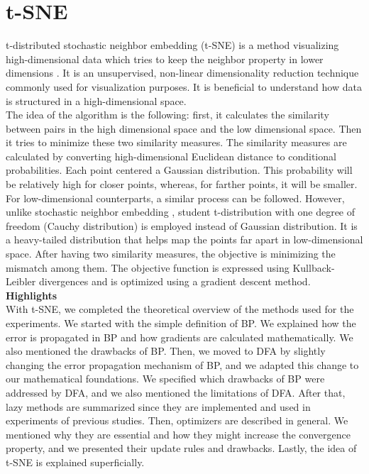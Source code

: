 \documentclass[a4paper, nobind]{templates/ociamthesis}
\begin{document}
\hypertarget{t-sne}{%
\section{t-SNE}\label{t-sne}}

t-distributed stochastic neighbor embedding (t-SNE) is a method visualizing high-dimensional data which tries to keep the neighbor property in lower dimensions \cite{vanDerMaaten2008}. It is an unsupervised, non-linear dimensionality reduction technique commonly used for visualization purposes. It is beneficial to understand how data is structured in a high-dimensional space.\\
The idea of the algorithm is the following: first, it calculates the similarity between pairs in the high dimensional space and the low dimensional space. Then it tries to minimize these two similarity measures. The similarity measures are calculated by converting high-dimensional Euclidean distance to conditional probabilities. Each point centered a Gaussian distribution. This probability will be relatively high for closer points, whereas, for farther points, it will be smaller. For low-dimensional counterparts, a similar process can be followed. However, unlike stochastic neighbor embedding \cite{Hinton_Roweis_2003}, student t-distribution with one degree of freedom (Cauchy distribution) is employed instead of Gaussian distribution. It is a heavy-tailed distribution that helps map the points far apart in low-dimensional space. After having two similarity measures, the objective is minimizing the mismatch among them. The objective function is expressed using Kullback-Leibler divergences and is optimized using a gradient descent method.\\

\noindent \textbf{Highlights}\\
\noindent With t-SNE, we completed the theoretical overview of the methods used for the experiments. We started with the simple definition of BP. We explained how the error is propagated in BP and how gradients are calculated mathematically. We also mentioned the drawbacks of BP. Then, we moved to DFA by slightly changing the error propagation mechanism of BP, and we adapted this change to our mathematical foundations. We specified which drawbacks of BP were addressed by DFA, and we also mentioned the limitations of DFA. After that, lazy methods are summarized since they are implemented and used in experiments of previous studies. Then, optimizers are described in general. We mentioned why they are essential and how they might increase the convergence property, and we presented their update rules and drawbacks. Lastly, the idea of t-SNE is explained superficially.
\end{document}
